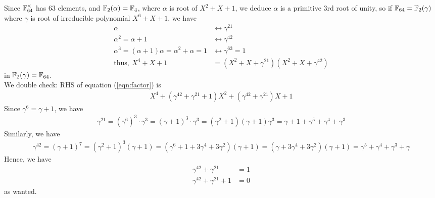 \documentclass{article}
\begin{document}
\begin{homeworkProblem}
    Since $\mathbb{F}_{64}^{\times}$ has $63$ elements, and $\mathbb{F}_2 (\alpha) = \mathbb{F}_4$, where $\alpha$ is root of $X^2 + X + 1$,
    we deduce $\alpha$ is a primitive $3$rd root of unity, so 
    if $\mathbb{F}_{64} = \mathbb{F}_2 (\gamma)$ where $\gamma$ is root of irreducible polynomial
    $X^6 + X + 1$, we have
    \begin{align}
        \alpha &\leftrightarrow \gamma^{21}\\
        \alpha^2 = \alpha + 1 &\leftrightarrow \gamma^{42}\\
        \alpha^3 = (\alpha + 1)\alpha = \alpha^2 + \alpha = 1 &\leftrightarrow \gamma^{63} = 1\\
        \text{thus}, \ X^4 + X + 1 &= (X^2 + X + \gamma^{21}) (X^2 + X + \gamma^{42}) \label{eqn:factor}
    \end{align}
    in $\mathbb{F}_2(\gamma) = \mathbb{F}_{64}$.\\
    We double check: RHS of equation (\ref{eqn:factor}) is
    \begin{align}
        X^4 + (\gamma^{42} + \gamma^{21} + 1)X^2 + (\gamma^{42} +  \gamma^{21})X +  1
    \end{align}
    Since $\gamma^6 = \gamma + 1$, we have
    \begin{align}
        \gamma^{21} = (\gamma^6)^3 \cdot \gamma^3 
        = (\gamma+ 1)^3 \cdot \gamma^3 
        = (\gamma^2 + 1)(\gamma+1)\gamma^3
        = \gamma + 1 + \gamma^5 + \gamma^4 + \gamma^3
    \end{align}
    Similarly, we have
    \begin{align}
        \gamma^{42} = (\gamma+1)^7 = (\gamma^2 + 1)^3 (\gamma+1)
        = (\gamma^6 + 1 + 3 \gamma^4 + 3 \gamma^2)(\gamma+1)
        =(\gamma + 3 \gamma^4 + 3 \gamma^2)(\gamma+1)
        = \gamma^5 + \gamma^4 + \gamma^3 + \gamma
    \end{align}
    Hence, we have
    \begin{align}
        \gamma^{42} + \gamma^{21} &= 1\\
        \gamma^{42} + \gamma^{21} + 1 &= 0
    \end{align}
    as wanted.
    

\end{homeworkProblem}

\pagebreak
\end{document}
